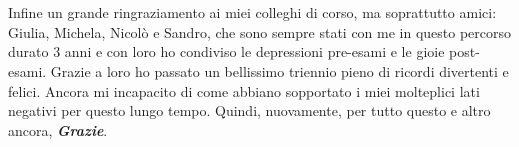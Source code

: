 \documentclass[a4paper]{article}
\begin{document}
        \\
        \\
        Infine un grande ringraziamento ai miei colleghi di corso, ma soprattutto amici: Giulia, Michela, Nicolò e Sandro, che sono sempre stati con me in questo percorso durato 3 anni e con loro ho condiviso le depressioni pre-esami e le gioie post-esami.
        Grazie a loro ho passato un bellissimo triennio pieno di ricordi divertenti e felici. Ancora mi incapacito di come abbiano sopportato i miei molteplici lati negativi per questo lungo tempo.  Quindi, nuovamente, per tutto questo e altro ancora, \textbf{\emph{Grazie}}.

        \newpage
        \printbibliography
\end{document}
